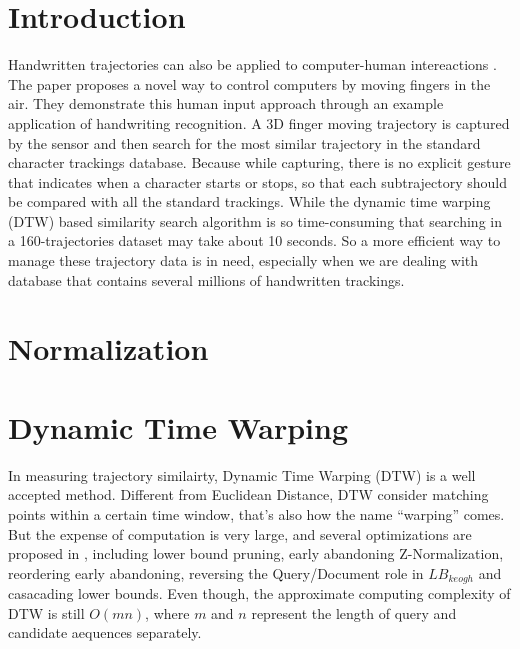 \documentclass[sigconf]{acmart}
\begin{document}





\maketitle

\section{Introduction}
Handwritten trajectories can also be applied to computer-human intereactions \cite{VikramLR13}. The paper proposes a novel way to control computers by moving fingers in the air. They demonstrate this human input approach through an example application of handwriting recognition. A 3D finger moving trajectory is captured by the sensor and then search for the most similar trajectory in the standard character trackings database. Because while capturing, there is no explicit gesture that indicates when a character starts or stops, so that each subtrajectory should be compared with all the standard trackings.  While the dynamic time warping (DTW)  based similarity search algorithm is so time-consuming  that searching in a 160-trajectories dataset may take about 10 seconds. So a more efficient way to manage these trajectory data is in need, especially when we are dealing with database that contains several millions of handwritten trackings. 






\section{Normalization}



\section{Dynamic Time Warping}
In measuring trajectory similairty, Dynamic Time Warping (DTW) is a well accepted method. Different from Euclidean Distance, DTW consider matching points within a certain time window, that's also how the name ``warping'' comes. But the expense of computation is very large, and several optimizations are proposed in \cite{RakthanmanonDTW, vldb/LB_keogh}, including lower bound pruning, early abandoning Z-Normalization, reordering early abandoning, reversing the Query/Document role in $LB_{keogh}$ and casacading lower bounds. Even though, the approximate computing complexity of DTW is still $O(mn)$, where $m$ and $n$ represent the length of query and candidate aequences separately. 
\end{document}
